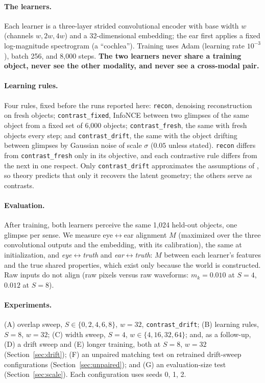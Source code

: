 \documentclass[11pt]{article}
\newcommand{\lr}{\ensuremath{\leftrightarrow}}
\begin{document}
\paragraph{The learners.} Each learner is a three-layer strided convolutional encoder with base width $w$ (channels $w,2w,4w$) and a 32-dimensional embedding; the ear first applies a fixed log-magnitude spectrogram (a ``cochlea''). Training uses Adam (learning rate $10^{-3}$), batch 256, and 8{,}000 steps. \textbf{The two learners never share a training object, never see the other modality, and never see a cross-modal pair.}

\paragraph{Learning rules.} Four rules, fixed before the runs reported here: \texttt{recon}, denoising reconstruction on fresh objects; \texttt{contrast\_fixed}, InfoNCE \citep{chen2020simclr} between two glimpses of the same object from a fixed set of 6{,}000 objects; \texttt{contrast\_fresh}, the same with fresh objects every step; and \texttt{contrast\_drift}, the same with the object drifting between glimpses by Gaussian noise of scale $\sigma$ ($0.05$ unless stated). \texttt{recon} differs from \texttt{contrast\_fresh} only in its objective, and each contrastive rule differs from the next in one respect. Only \texttt{contrast\_drift} approximates the assumptions of \citet{zimmermann2021contrastive}, so theory predicts that only it recovers the latent geometry; the others serve as contrasts.

\paragraph{Evaluation.} After training, both learners perceive the same 1{,}024 held-out objects, one glimpse per sense. We measure eye\lr{}ear alignment $M$ (maximized over the three convolutional outputs and the embedding, with its calibration), the same at initialization, and \emph{eye\lr{}truth} and \emph{ear\lr{}truth}: $M$ between each learner's features and the true shared properties, which exist only because the world is constructed. Raw inputs do not align (raw pixels versus raw waveforms: $m_k=0.010$ at $S=4$, $0.012$ at $S=8$).

\paragraph{Experiments.} (A) overlap sweep, $S\in\{0,2,4,6,8\}$, $w=32$, \texttt{contrast\_drift}; (B) learning rules, $S=8$, $w=32$; (C) width sweep, $S=4$, $w\in\{4,16,32,64\}$; and, as a follow-up, (D) a drift sweep and (E) longer training, both at $S=8$, $w=32$ (Section~\ref{sec:drift}); (F) an unpaired matching test on retrained drift-sweep configurations (Section~\ref{sec:unpaired}); and (G) an evaluation-size test (Section~\ref{sec:scale}). Each configuration uses seeds 0, 1, 2.
\end{document}
